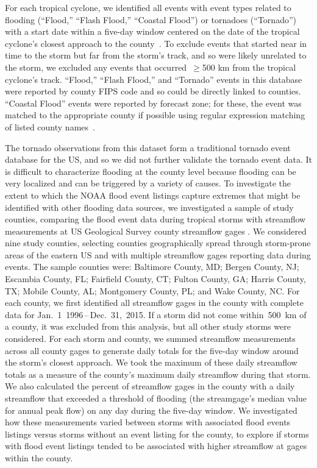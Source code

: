For each tropical cyclone, we identified all events with event types related to
flooding (``Flood,'' ``Flash Flood,'' ``Coastal Flood'') or tornadoes
(``Tornado'') with a start date within a five-day window centered on the date
of the tropical cyclone's closest approach to the
county~\parencite{hurricaneexposuredata}. To exclude events that started near
in time to the storm but far from the storm's track, and so were likely
unrelated to the storm, we excluded any events that occurred~$\ge$500
\si{\kilo\metre} from the tropical cyclone's track. ``Flood,'' ``Flash Flood,''
and ``Tornado'' events in this database were reported by county \ac{FIPS} code
and so could be directly linked to counties.  ``Coastal Flood'' events were
reported by forecast zone; for these, the event was matched to the appropriate
county if possible using regular expression matching of listed county
names~\parencite{noaastormevents}. 

The tornado observations from this dataset form a traditional tornado event
database for the \ac{US}, and so we did not further validate
the tornado event data. It is difficult to characterize flooding at the county
level because flooding can be very localized and can be triggered by a variety
of causes. To investigate the extent to which the NOAA flood event listings
capture extremes that might be identified with other flooding data sources, we
investigated a sample of study counties, comparing the flood event data during
tropical storms with streamflow measurements at \ac{US} Geological Survey
county streamflow gages \parencite{usgsgages, countyfloods, dataRetrieval}.  
We considered nine study counties, selecting counties geographically spread
through storm-prone areas of the eastern \ac{US} and with multiple streamflow
gages reporting data during events. The sample counties were: Baltimore County,
MD; Bergen County, NJ; Escambia County, FL; Fairfield County, CT; Fulton
County, GA; Harris County, TX; Mobile County, AL; Montgomery County, PL; and
Wake County, NC. For each county, we first identified all streamflow gages in
the county with complete data for Jan.~1~1996\,--\,Dec.~31,~2015. If a storm
did not come within~500~\si{\kilo\metre} of a county, it was excluded from this
analysis, but all other study storms were considered. 
For each storm and county, we summed streamflow measurements across all county
gages to generate daily totals for the five-day window around the storm's
closest approach. We took the maximum of these daily streamflow totals as a
measure of the county's maximum daily streamflow during that storm. We also
calculated the percent of streamflow gages in the county with a daily
streamflow that exceeded a threshold of flooding (the streamgage's median value
for annual peak flow) on any day during the five-day
window. We investigated how these measurements varied between storms with
associated flood events listings versus storms without an
event listing for the county, to explore if storms with flood event listings
tended to be associated with higher streamflow at gages within the county.

